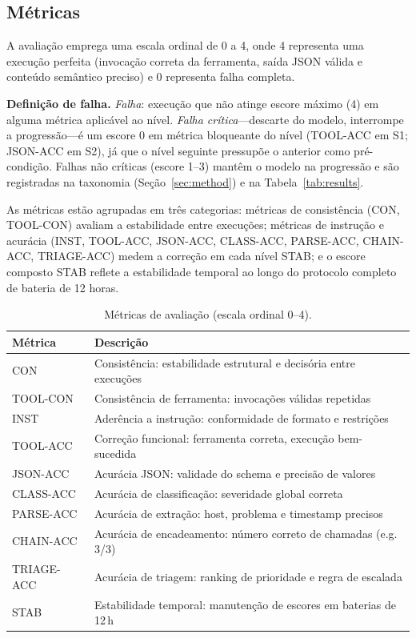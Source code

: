 \documentclass{kdmile}
\begin{document}
\subsection{Métricas}

A avaliação emprega uma escala ordinal de 0 a 4, onde 4 representa uma execução
perfeita (invocação correta da ferramenta, saída JSON válida e conteúdo semântico
preciso) e 0 representa falha completa.

\textbf{Definição de falha.} \emph{Falha}: execução que não atinge escore
máximo (4) em alguma métrica aplicável ao nível. \emph{Falha crítica}—\allowbreak descarte
do modelo, interrompe a progressão—\allowbreak é um escore 0 em métrica bloqueante do nível
(TOOL-ACC em S1; JSON-ACC em S2), já que o nível seguinte pressupõe o anterior
como pré-condição. Falhas não críticas (escore 1--3) mantêm o modelo na
progressão e são registradas na taxonomia (Seção~\ref{sec:method}) e na
Tabela~\ref{tab:results}.

As métricas estão agrupadas em três
categorias: métricas de consistência (CON, TOOL-CON) avaliam a estabilidade
entre execuções; métricas de instrução e acurácia (INST, TOOL-ACC, JSON-ACC,
CLASS-ACC, PARSE-ACC, CHAIN-ACC, TRIAGE-ACC) medem a correção em cada nível
STAB; e o escore composto STAB reflete a estabilidade temporal ao longo do
protocolo completo de bateria de 12 horas.

\begin{table}[ht]
\centering
\caption{Métricas de avaliação (escala ordinal 0--4).}
\label{tab:metrics}
\begin{tabular}{ll}
\toprule
\textbf{Métrica} & \textbf{Descrição} \\
\midrule
CON       & Consistência: estabilidade estrutural e decisória entre execuções \\
TOOL-CON  & Consistência de ferramenta: invocações válidas repetidas \\
INST      & Aderência a instrução: conformidade de formato e restrições \\
TOOL-ACC  & Correção funcional: ferramenta correta, execução bem-sucedida \\
JSON-ACC  & Acurácia JSON: validade do schema e precisão de valores \\
CLASS-ACC & Acurácia de classificação: severidade global correta \\
PARSE-ACC & Acurácia de extração: host, problema e timestamp precisos \\
CHAIN-ACC & Acurácia de encadeamento: número correto de chamadas (e.g. 3/3) \\
TRIAGE-ACC& Acurácia de triagem: ranking de prioridade e regra de escalada \\
STAB      & Estabilidade temporal: manutenção de escores em baterias de 12\,h \\
\bottomrule
\end{tabular}
\end{table}
\end{document}
